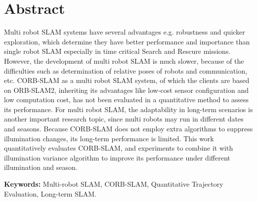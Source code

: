 
\chapter*{Abstract}


Multi robot SLAM systems have several advantages e.g. robustness and quicker exploration, which determine they have better performance and importance than single robot SLAM especially in time critical Search and Rescure missions. 
However, the development of multi robot SLAM is much slower, because of the difficulties such as determination of relative poses of robots and communication, etc. 
CORB-SLAM as a multi robot SLAM system, of which the clients are based on ORB-SLAM2, inheriting its advantages like low-cost sensor configuration and low computation cost, has not been evaluated in a quantitative method to assess its performance. 
For multi robot SLAM, the adaptability in long-term scenarios is another important research topic, since multi robots may run in different dates and seasons.
 Because CORB-SLAM does not employ extra algorithms to suppress illumination changes, its long-term performance is limited.
This work quantitatively evaluates CORB-SLAM, and experiments to combine it with illumination variance algorithm to improve its performance under different illumination and season.


\par
\textbf{Keywords:} Multi-robot SLAM, CORB-SLAM, Quantitative Trajectory Evaluation, Long-term SLAM.

